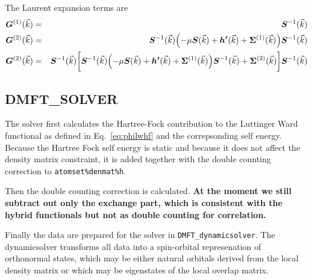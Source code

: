 \documentclass[11pt,a4paper]{report}
\newcommand{\mat}[1]{\bm{#1}}  %
\begin{document}
The Laurent expansion terms are
\begin{eqnarray}
\mat{G}^{(1)}(\vec{k})&=&\mat{S}^{-1}(\vec{k})
\nonumber\\
\mat{G}^{(2)}(\vec{k})&=&\mat{S}^{-1}(\vec{k})
\Bigl(-\mu\mat{S}(\vec{k})+\mat{h'}(\vec{k})+\mat{\Sigma}^{(1)}(\vec{k})
\Bigr)
\mat{S}^{-1}(\vec{k})
\nonumber\\
\mat{G}^{(2)}(\vec{k})&=&
\mat{S}^{-1}(\vec{k})
\biggl[
\mat{S}^{-1}(\vec{k})
\Bigl(-\mu\mat{S}(\vec{k})+\mat{h'}(\vec{k})+\mat{\Sigma}^{(1)}(\vec{k})
\Bigr)
\mat{S}^{-1}(\vec{k})+\mat{\Sigma}^{(2)}(\vec{k})
\biggr]
\mat{S}^{-1}(\vec{k})
\nonumber\\
\end{eqnarray}


\subsection{DMFT\_SOLVER}
The solver first calculates the Hartree-Fock contribution to the
Luttinger Ward functional as defined in Eq.~\ref{eq:philwhf} and the
correpsonding self energy. Because the Hartree Fock self energy is
static and because it does not affect the density matrix constraint,
it is added together with the double counting correction to
\verb|atomset%denmat%h|.


Then the double counting correction is calculated. \textbf{At the
  moment we still subtract out only the exchange part, which is
  consistent with the hybrid functionals but not as double counting
  for correlation.}

Finally the data are prepared for the solver in
\verb|DMFT_dynamicsolver|. The dynamicsolver transforms all data into
a spin-orbital represenation of orthonormal states, which may be
either natural orbitals derived from the local density matrix or which
may be eigenstates of the local overlap matrix.


\appendix
\end{document}
